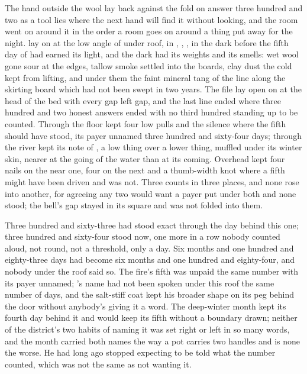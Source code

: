 
The hand outside the wool lay back against the fold on answer three hundred and two as a tool lies where the next hand will find it without looking, and the room went on around it in the order a room goes on around a thing put away for the night.  lay on  at the low angle of  under  roof, in , , , in the dark before the fifth day of  had earned its light, and the dark had its weights and its smells: wet wool gone sour at the edges, tallow smoke settled into the boards, clay dust the cold kept from lifting, and under them the faint mineral tang of the line along the skirting board which had not been swept in two years. The file lay open on  at the head of the bed with every gap left gap, and the last line ended where three hundred and two honest answers ended with no third hundred standing up to be counted. Through the floor  kept four low pulls and the silence where the fifth should have stood, its payer unnamed three hundred and sixty-four days; through  the river kept its note of , a low thing over a lower thing, muffled under its winter skin, nearer at the going of the water than at its coming. Overhead  kept four nails on the near one, four on the next and a thumb-width knot where a fifth might have been driven and was not. Three counts in three places, and none rose into another, for agreeing any two would want a payer put under both and none stood; the bell's gap stayed in its square and was not folded into them.

Three hundred and sixty-three had stood exact through the day behind this one; three hundred and sixty-four stood now, one more in a row nobody counted aloud, not round, not a threshold, only a day. Six months and one hundred and eighty-three days had become six months and one hundred and eighty-four, and nobody under the roof said so. The fire's fifth was unpaid the same number with its payer unnamed; 's name had not been spoken under this roof the same number of days, and the salt-stiff coat kept his broader shape on its peg behind the door without anybody's giving it a word. The deep-winter month kept its fourth day behind it and would keep its fifth without a boundary drawn; neither of the district's two habits of naming it was set right or left in so many words, and the month carried both names the way a pot carries two handles and is none the worse. He had long ago stopped expecting to be told what the number counted, which was not the same as not wanting it.

